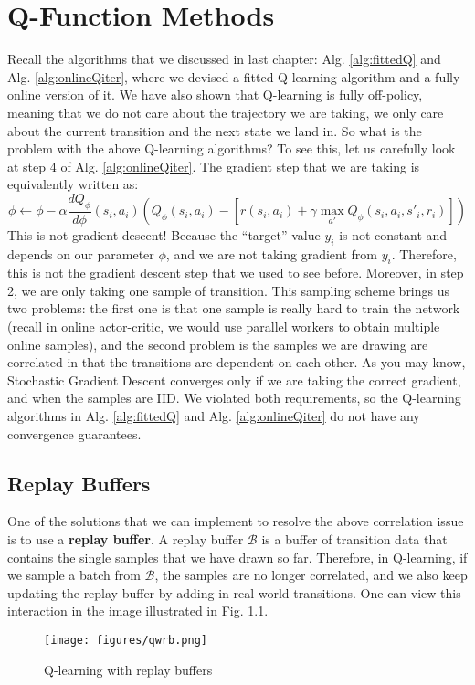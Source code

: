 \chapter{Q-Function Methods}
Recall the algorithms that we discussed in last chapter: Alg. \ref{alg:fittedQ} and Alg. \ref{alg:onlineQiter}, where we devised a fitted Q-learning algorithm and a fully online version of it. We have also shown that Q-learning is fully off-policy, meaning that we do not care about the trajectory we are taking, we only care about the current transition and the next state we land in. So what is the problem with the above Q-learning algorithms? To see this, let us carefully look at step 4 of Alg. \ref{alg:onlineQiter}. The gradient step that we are taking is equivalently written as:
$$\phi\leftarrow \phi - \alpha\frac{dQ_\phi}{d\phi}(s_i,a_i)\left(Q_\phi(s_i,a_i) - \left[r(s_i,a_i)+\gamma\max_{a'}Q_\phi(s_i,a_i,s'_i,r_i)\right]\right)$$
This is not gradient descent! Because the ``target'' value $y_i$ is not constant and depends on our parameter $\phi$, and we are not taking gradient from $y_i$. Therefore, this is not the gradient descent step that we used to see before. Moreover, in step 2, we are only taking one sample of transition. This sampling scheme brings us two problems: the first one is that one sample is really hard to train the network (recall in online actor-critic, we would use parallel workers to obtain multiple online samples), and the second problem is the samples we are drawing are correlated in that the transitions are dependent on each other. As you may know, Stochastic Gradient Descent converges only if we are taking the correct gradient, and when the samples are IID. We violated both requirements, so the Q-learning algorithms in Alg. \ref{alg:fittedQ} and Alg. \ref{alg:onlineQiter} do not have any convergence guarantees. 

\section{Replay Buffers}
One of the solutions that we can implement to resolve the above correlation issue is to use a \textbf{replay buffer}. A replay buffer $\mathcal{B}$ is a buffer of transition data that contains the single samples that we have drawn so far. Therefore, in Q-learning, if we sample a batch from $\mathcal{B}$, the samples are no longer correlated, and we also keep updating the replay buffer by adding in real-world transitions. One can view this interaction in the image illustrated in Fig. \ref{fig:qwfb}.
\begin{figure}
    \centering
    \texttt{[image: figures/qwrb.png]}
    \caption{Q-learning with replay buffers}
    \label{fig:qwfb}
\end{figure}


